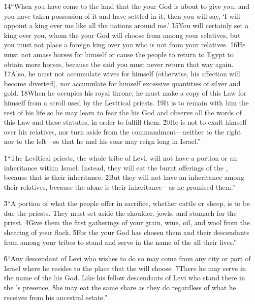 \v{14}``When you have come to the land that the  your God is about to give you, and you have taken possession of it and have settled in it, then you will say, `I will appoint a king over me like all the nations around me.' \v{15}You will certainly set a king over you, whom the  your God will choose from among your relatives, but you must not place a foreign king over you who is not from your relatives. \v{16}He must not amass horses for himself or cause the people to return to Egypt to obtain more horses, because the  said you must never return that way again. \v{17}Also, he must not accumulate wives for himself (otherwise, his affection will become diverted), nor accumulate for himself excessive quantities of silver and gold. \v{18}When he occupies his royal throne, he must make a copy of this Law for himself from a scroll used by the Levitical priests. \v{19}It is to remain with him the rest of his life so he may learn to fear the  his God and observe all the words of this Law and these statutes, in order to fulfill them. \v{20}He is not to exalt himself over his relatives, nor turn aside from the commandment---neither to the right nor to the left---so that he and his sons may reign long in Israel.''

\v{1}``The Levitical priests, the whole tribe of Levi, will not have a portion or an inheritance within Israel. Instead, they will eat the burnt offerings of the , because that is their inheritance. \v{2}But they will not have an inheritance among their relatives, because the  alone is their inheritance---as he promised them.''

\v{3}``A portion of what the people offer in sacrifice, whether cattle or sheep, is to be due the priests. They must set aside the shoulder, jowls, and stomach for the priest. \v{4}Give them the first gatherings of your grain, wine, oil, and wool from the shearing of your flock. \v{5}For the  your God has chosen them and their descendants from among your tribes to stand and serve in the name of the  all their lives.''

\v{6}``Any descendant of Levi who wishes to do so may come from any city or part of Israel where he resides to the place that the  will choose. \v{7}There he may serve in the name of the  his God. Like his fellow descendants of Levi who stand there in the 's presence, \v{8}he may eat the same share as they do regardless of what he receives from his ancestral estate.''

